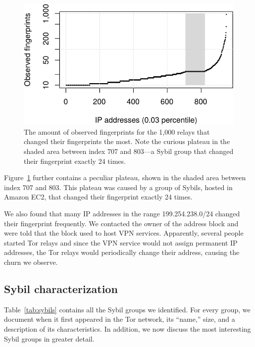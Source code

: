 \begin{figure}[t]
	\centering
	\includegraphics[width=\linewidth]{diagrams/fingerprints.pdf}
	\caption{The amount of observed fingerprints for the 1,000 relays that
	changed their fingerprints the most.  Note the curious plateau in the shaded
	area between index 707 and 803---a Sybil group that changed their
	fingerprint exactly 24 times.}
	\label{fig:fingerprints}
\end{figure}

Figure~\ref{fig:fingerprints} further contains a peculiar plateau, shown in the
shaded area between index 707 and 803.  This plateau was caused by a group of
Sybils, hosted in Amazon EC2, that changed their fingerprint exactly 24 times.

We also found that many IP addresses in the range 199.254.238.0/24 changed their
fingerprint frequently.  We contacted the owner of the address block and were
told that the block used to host VPN services.  Apparently, several people
started Tor relays and since the VPN service would not assign permanent IP
addresses, the Tor relays would periodically change their address, causing the
churn we observe.

\subsection{Sybil characterization}
\label{sec:sybil_groups}
Table~\ref{tab:sybils} contains all the Sybil groups we identified.  For every
group, we document when it first appeared in the Tor network, its ``name,''
size, and a description of its characteristics.  In addition, we now discuss the
most interesting Sybil groups in greater detail.

